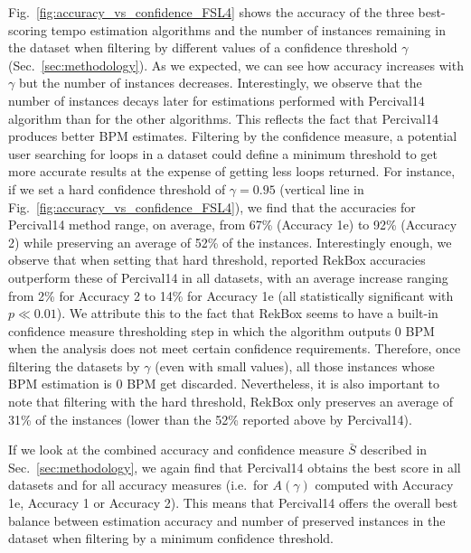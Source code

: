 \documentclass{article}
\begin{document}
Fig.~\ref{fig:accuracy_vs_confidence_FSL4} shows the accuracy of the three best-scoring tempo estimation algorithms and the number of instances remaining in the dataset when filtering by different values of a confidence threshold $\gamma$ (Sec.~\ref{sec:methodology}).
As we expected, we can see how accuracy increases with $\gamma$ but the number of instances decreases.
Interestingly, we observe that the number of instances decays later for estimations performed with Percival14 algorithm than for the other algorithms.
This reflects the fact that Percival14 produces better BPM estimates.
Filtering by the confidence measure, a potential user searching for loops in a dataset could define a minimum threshold to get more accurate results at the expense of getting less loops returned. 
For instance, if we set a hard confidence threshold of $\gamma=0.95$ (vertical line in Fig.~\ref{fig:accuracy_vs_confidence_FSL4}), we find that the accuracies for Percival14 method range, on average, from 67\% (Accuracy 1e) to 92\% (Accuracy 2) while preserving an average of 52\% of the instances. 
Interestingly enough, we observe that when setting that hard threshold, reported RekBox accuracies outperform these of Percival14 in all datasets, with an average increase ranging from 2\% for Accuracy 2 to 14\% for Accuracy 1e (all statistically significant with $p \ll 0.01$). 
We attribute this to the fact that RekBox seems to have a built-in confidence measure thresholding step in which the algorithm outputs 0 BPM when the analysis does not meet certain confidence requirements. Therefore, once filtering the datasets by $\gamma$ (even with small values), all those instances whose BPM estimation is 0 BPM get discarded. Nevertheless, it is also important to note that filtering with the hard threshold, RekBox only preserves an average of 31\% of the instances (lower than the 52\% reported above by Percival14). %

If we look at the combined accuracy and confidence measure $\bar S$ described in Sec.~\ref{sec:methodology}, we again find that Percival14 obtains the best score in all datasets and for all accuracy measures (i.e.~for $A(\gamma)$ computed with Accuracy 1e, Accuracy 1 or Accuracy 2). This means that Percival14 offers the overall best balance between estimation accuracy and number of preserved instances in the dataset when filtering by a minimum confidence threshold. %
\end{document}
